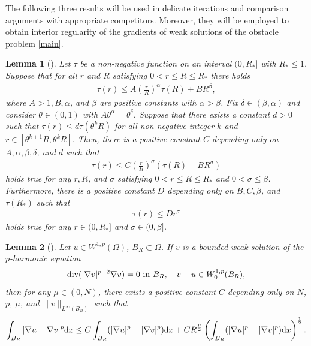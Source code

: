\documentclass[onecolumn]{autart}
\newtheorem{lemma}{Lemma}
\begin{document}
The following three results will be used in delicate iterations and comparison arguments with appropriate competitors. Moreover, they will be employed to obtain interior regularity of the gradients of  weak  solutions of  the  obstacle problem \eqref{main}.

\begin{lemma}[{\cite[Lemma A.3]{Zheng:2022}}]\label{lem4}Let $\tau$ be a non-negative function on an interval $(0, R_*]$ with $R_* \leq 1$. Suppose that for all $r$ and $R$ satisfying $ 0<r\leq R\leq R_*$ there holds
	\begin{align*}
		\tau(r) \leq A \left( \frac{r}{R} \right)^\alpha \tau(R) + BR^\beta, %
	\end{align*}
	where $A > 1,B, \alpha$, and $\beta$ are positive constants with $ \alpha>\beta$. Fix $\delta \in (\beta, \alpha)$ and consider $\theta \in (0, 1)$ with $A\theta^\alpha = \theta^\delta$. Suppose that there exists a constant $d > 0$ such that $\tau(r) \leq d\tau(\theta^k R)$ for all non-negative integer $k$ and $r \in [\theta^{k+1} R, \theta^k R]$. Then, there is a positive constant $C$ depending only on $ A,\alpha,\beta, \delta$, and $d$  such that
	\begin{align*}
		\tau(r) \leq C \left( \frac{r}{R} \right)^\sigma (\tau(R) + BR^\sigma)
	\end{align*}
	holds true for any $r,R$, and $\sigma$ satisfying $0<r\leq R\leq R_*$ and $0 < \sigma \leq \beta$. Furthermore, there is a positive constant $D  $ depending only on $B,C, \beta$, and $\tau(R_*)$  such that
	\begin{align*}
		\tau(r) \leq D r^\sigma%
	\end{align*}
	holds true for any $r\in (0,R_*]$ and $\sigma\in (0,\beta]$.
\end{lemma}

\begin{lemma}[{\cite[Lemma 3.1]{Zheng:2017}}] \label{lem2}
	Let $u \in W^{1,p}(\Omega)$, $B_R \subset \Omega$. If $v$ is a bounded weak solution of the $p$-harmonic equation
	\begin{align}
		\mathrm{div} (|\nabla v|^{p-2}\nabla v) = 0 \text{ in } B_R, \quad v - u \in W_0^{1,p}(B_R),\notag
	\end{align}
	then for any $\mu \in (0, N)$, there exists a positive constant $C$ depending only on $N$, $p$, $\mu$,  and $\|v\|_{L^\infty(B_R)}$ such that
	\begin{align}
		\int_{B_R} |\nabla u - \nabla v|^p \mathrm{d}x \leq C \int_{B_R} (|\nabla u|^p - |\nabla v|^p) \mathrm{d}x + CR^{\frac{\mu}{2}} \left( \int_{B_R} (|\nabla u|^p - |\nabla v|^p) \mathrm{d}x \right)^{\frac{1}{2}}.\notag
	\end{align}
\end{lemma}
\end{document}
